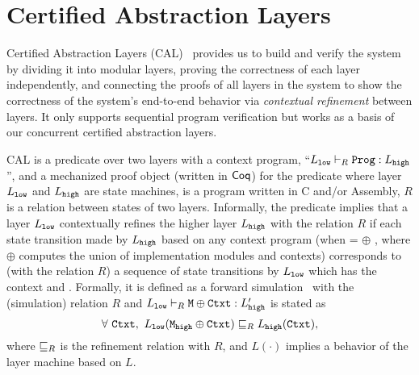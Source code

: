 \section{Certified Abstraction Layers}
\label{chapter:ccal:sec:cal}

Certified Abstraction Layers (CAL)~\cite{deepspec} provides us to build and verify the system by dividing it into modular layers, 
proving the correctness of each layer independently, and connecting the proofs of all layers in the system to show the correctness of the system's end-to-end behavior via \textit{contextual refinement} between layers. 
It only supports sequential program verification but works as a basis of our concurrent certified abstraction layers.

CAL is a predicate over two layers with a context program, 
``$L_{{\mathrm{\texttt{low}}}} \vdash_{R} {\mathrm{\texttt{Prog}}} : L_{{\mathrm{\texttt{high}}}}$'', 
and a mechanized proof object (written in $\mathsf{Coq}$) for the predicate where layer $L_{{\mathrm{\texttt{low}}}}$ and $L_{{\mathrm{\texttt{high}}}}$ are state machines,  is a program written in C and/or Assembly, $R$ is a relation between states of two layers.
Informally, the predicate implies that 
a layer $L_{{\mathrm{\texttt{low}}}}$ contextually refines the higher layer $L_{{\mathrm{\texttt{high}}}}$ with the relation $R$
 if each state transition made by $L_{{\mathrm{\texttt{high}}}}$ based on any context program  (when  =  $\oplus$ , where $\oplus$ computes the union of implementation modules and contexts) corresponds to (with the relation $R$)  a sequence of 
 state transitions by $L_{{\mathrm{\texttt{low}}}}$ which has the context  and  .
 Formally, it is defined as a forward simulation~\cite{Lynch95,leroy09,Milner71,Park81} with the (simulation) relation $R$
 and  $L_{{\mathrm{\texttt{low}}}} \vdash_{R} {\mathrm{\texttt{M}}} \oplus {\mathrm{\texttt{Ctxt}}} : L_{{\mathrm{\texttt{high}}}}'$ is stated as
$$\forall\ \codeinmath{Ctxt},\ L_{\codeinmath{low}} (\codeinmath{M}_{\codeinmath{high}} \oplus \codeinmath{Ctxt}) \refines_{R} L_{\codeinmath{high}} (\codeinmath{Ctxt}),$$
where $\sqsubseteq_{R}$ is the refinement relation with $R$, and $L(\cdot)$ implies  a  behavior of the layer machine based on $L$.


